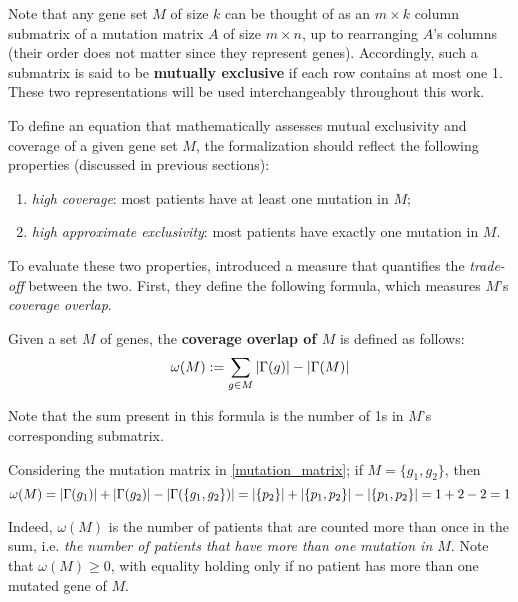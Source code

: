 Note that any gene set $M$ of size $k$ can be thought of as an $m \times k$ column submatrix of a mutation matrix $A$ of size $m \times n$, up to rearranging $A$'s columns (their order does not matter since they represent genes). Accordingly, such a submatrix is said to be \textbf{mutually exclusive} if each row contains at most one 1. These two representations will be used interchangeably throughout this work.

To define an equation that mathematically assesses mutual exclusivity and coverage of a given gene set $M$, the formalization should reflect the following properties (discussed in previous sections):

\begin{enumerate}[label=\roman*), font=\itshape]
    \item \textit{high coverage}: most patients have at least one mutation in $M$;
    \item \textit{high approximate exclusivity}: most patients have exactly one mutation in $M$.
\end{enumerate}

To evaluate these two properties, \textcite{dendrix} introduced a measure that quantifies the \textit{trade-off} between the two. First, they define the following formula, which measures $M$'s \textit{coverage overlap}.

\begin{definition} \label{cov_over}
    Given a set $M$ of genes, the \textbf{coverage overlap of $M$} is defined as follows: $$\omega(M) := \sum_{g \in M}{\left|\Gamma(g)\right|} - \left|\Gamma(M)\right|$$
\end{definition}

Note that the sum present in this formula is the number of 1s in $M$'s corresponding submatrix.

\begin{example}
    Considering the mutation matrix in \cref{mutation_matrix}; if $M=\{g_1, g_2\}$, then $$\omega(M)=\left|\Gamma(g_1)\right| + \left|\Gamma(g_2)\right| - \left|\Gamma(\{g_1, g_2\})\right| = \left|\{p_2\}\right| + \left|\{p_1, p_2\}\right| - \left|\{p_1, p_2\}\right| = 1 + 2 - 2 = 1$$
\end{example}

Indeed, $\omega(M)$ is the number of patients that are counted more than once in the sum, i.e. \textit{the number of patients that have more than one mutation in $M$}. Note that $\omega(M) \ge 0$, with equality holding only if no patient has more than one mutated gene of $M$.

